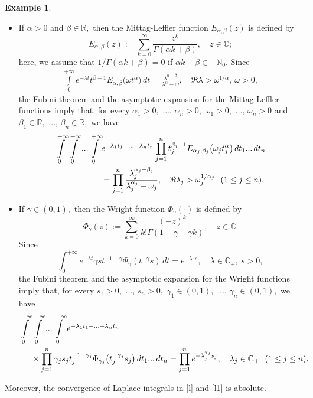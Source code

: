 \documentclass{amsart}
\theoremstyle{definition}
\newtheorem{example}[thm]{Example}
\theoremstyle{remark}
\numberwithin{equation}{section}
\begin{document}
\begin{example}\label{pol}
\begin{itemize}
\item[(i)] If $\alpha>0$ and $\beta \in {\mathbb R},$ then the
Mittag-Leffler function $E_{\alpha,\beta}(z)$ is defined by
$$
E_{\alpha,\beta}(z):=\sum \limits_{k=0}^{\infty}\frac{z^{k}}{\Gamma(\alpha
k+\beta)},\quad z\in {\mathbb C};
$$
here, we assume that
$1/\Gamma(\alpha k+\beta)=0$ if $\alpha k+\beta \in -{{\mathbb
N}_{0}}.$ 
Since
\begin{align*}
\int \limits^{+\infty}_{0}e^{-\lambda t}t^{\beta-1}E_{\alpha,\beta}
\bigl( \omega t^{\alpha}\bigr) \, dt=\frac{\lambda^{\alpha-\beta}}{\lambda^{\alpha}-\omega},
\quad \Re \lambda >\omega^{1/\alpha},\ \omega>0,
\end{align*}
the Fubini theorem and the asymptotic expansion for the Mittag-Leffler functions \cite[Theorem 1.5.1]{FKP} imply that, for every $\alpha_{1}>0,$ ..., $\alpha_{n}>0,$ $\omega_{1}>0,$ ..., $\omega_{n}>0$ and $\beta_{1} \in {\mathbb R},$ ..., $\beta_{n}\in {\mathbb R},$ we have
\begin{align}\notag
\int \limits^{+\infty}_{0} \int \limits^{+\infty}_{0}...\int \limits^{+\infty}_{0} & e^{-\lambda_{1} t_{1}-...-\lambda_{n}t_{n}}\prod_{j=1}^{n}t_{j}^{\beta_{j}-1}E_{\alpha_{j},\beta_{j}}
\bigl( \omega_{j} t_{j}^{\alpha}\bigr) \, dt_{1}...\, dt_{n}
\\\label{l}&=\prod_{j=1}^{n}\frac{\lambda_{j}^{\alpha_{j}-\beta_{j}}}{\lambda_{j}^{\alpha_{j}}-\omega_{j}},
\quad \Re \lambda_{j} >\omega_{j}^{1/\alpha_{j}}\  \ (1\leq j\leq n).
\end{align}
\item[(ii)] If $\gamma \in (0,1),$ then the Wright function
$\Phi_{\gamma}(\cdot)$ is defined by
$$
\Phi_{\gamma}(z):=\sum \limits_{k=0}^{\infty}
\frac{(-z)^{k}}{k! \Gamma (1-\gamma -\gamma k)},\quad z\in {\mathbb C}.
$$
Since
$$
\int^{+\infty}_{0}e^{-\lambda t}\gamma s t^{-1-\gamma}
\Phi_{\gamma}(t^{-\gamma}s)\, dt=e^{-\lambda^{\gamma}s},\quad \lambda \in {\mathbb C}_{+},\ s>0,
$$ 
the Fubini theorem and the asymptotic expansion for the Wright functions \cite[p. 67, l. -1]{FKP} imply that, for every $s_{1}>0,$ ..., $s_{n}>0,$ $\gamma_{1} \in (0,1),$ ..., $\gamma_{n}\in (0,1),$ we have
\begin{align}\notag
\int \limits^{+\infty}_{0} &\int \limits^{+\infty}_{0}...\int \limits^{+\infty}_{0}  e^{-\lambda_{1} t_{1}-...-\lambda_{n}t_{n}}\\\label{l1} & \times \prod_{j=1}^{n}\gamma_{j} s_{j} t_{j}^{-1-\gamma_{j}}
\Phi_{\gamma_{j}}\bigl(t_{j}^{-\gamma_{j}}s_{j}\bigr)\, dt_{1}...\, dt_{n}=\prod_{j=1}^{n}e^{-\lambda_{j}^{\gamma_{j}}s_{j}},\quad \lambda_{j} \in {\mathbb C}_{+} \  \ (1\leq j\leq n).
\end{align}
\end{itemize}
Moreover, the convergence of Laplace integrals in \eqref{l} and \eqref{l1} is absolute.
\end{example}
\end{document}
